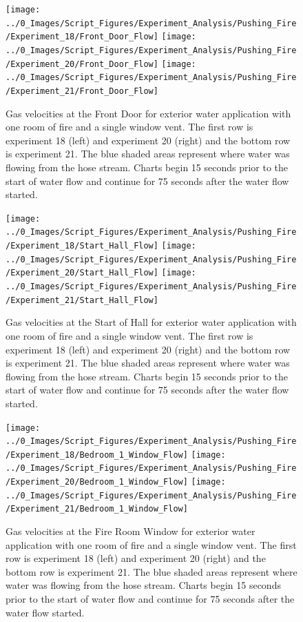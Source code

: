 \documentclass[12pt,oneside]{book}
\begin{document}
\begin{figure}[H]
\centering
\texttt{[image: ../0\_Images/Script\_Figures/Experiment\_Analysis/Pushing\_Fire/Experiment\_18/Front\_Door\_Flow]}
\texttt{[image: ../0\_Images/Script\_Figures/Experiment\_Analysis/Pushing\_Fire/Experiment\_20/Front\_Door\_Flow]}
\texttt{[image: ../0\_Images/Script\_Figures/Experiment\_Analysis/Pushing\_Fire/Experiment\_21/Front\_Door\_Flow]}
\caption[Gas Velocities - Single Room of Fire - Exterior]{Gas velocities at the Front Door for exterior water application with one room of fire and a single window vent. The first row is experiment 18 (left) and experiment 20 (right) and the bottom row is experiment 21. The blue shaded areas represent where water was flowing from the hose stream. Charts begin 15 seconds prior to the start of water flow and continue for 75 seconds after the water flow started.}
\label{fig:push_fire_exterior_Front_Door}
\end{figure}

\begin{figure}[H]
\centering
\texttt{[image: ../0\_Images/Script\_Figures/Experiment\_Analysis/Pushing\_Fire/Experiment\_18/Start\_Hall\_Flow]}
\texttt{[image: ../0\_Images/Script\_Figures/Experiment\_Analysis/Pushing\_Fire/Experiment\_20/Start\_Hall\_Flow]}
\texttt{[image: ../0\_Images/Script\_Figures/Experiment\_Analysis/Pushing\_Fire/Experiment\_21/Start\_Hall\_Flow]}
\caption[Gas Velocities - Single Room of Fire - Exterior]{Gas velocities at the Start of Hall for exterior water application with one room of fire and a single window vent. The first row is experiment 18 (left) and experiment 20 (right) and the bottom row is experiment 21. The blue shaded areas represent where water was flowing from the hose stream. Charts begin 15 seconds prior to the start of water flow and continue for 75 seconds after the water flow started.}
\label{fig:push_fire_exterior_Start_Hall}
\end{figure}

\begin{figure}[H]
\centering
\texttt{[image: ../0\_Images/Script\_Figures/Experiment\_Analysis/Pushing\_Fire/Experiment\_18/Bedroom\_1\_Window\_Flow]}
\texttt{[image: ../0\_Images/Script\_Figures/Experiment\_Analysis/Pushing\_Fire/Experiment\_20/Bedroom\_1\_Window\_Flow]}
\texttt{[image: ../0\_Images/Script\_Figures/Experiment\_Analysis/Pushing\_Fire/Experiment\_21/Bedroom\_1\_Window\_Flow]}
\caption[Gas Velocities - Single Room of Fire - Exterior]{Gas velocities at the Fire Room Window for exterior water application with one room of fire and a single window vent. The first row is experiment 18 (left) and experiment 20 (right) and the bottom row is experiment 21. The blue shaded areas represent where water was flowing from the hose stream. Charts begin 15 seconds prior to the start of water flow and continue for 75 seconds after the water flow started.}
\label{fig:push_fire_exterior_Fire_Room}
\end{figure}
\end{document}
